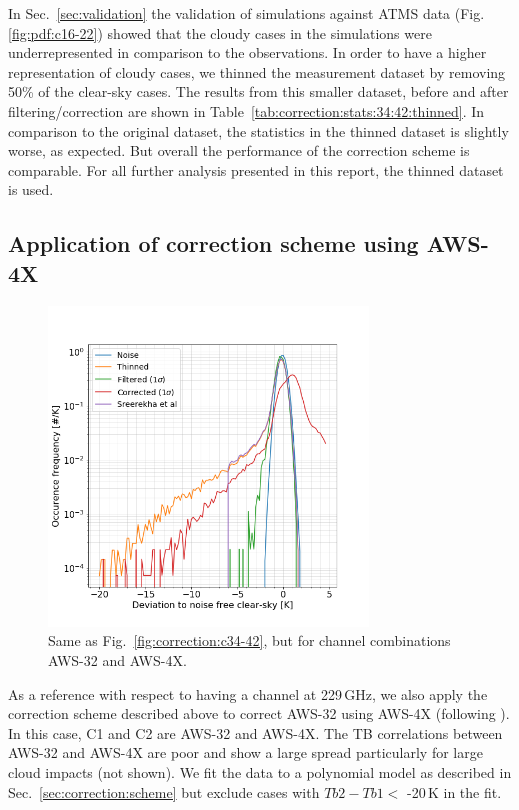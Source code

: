 \documentclass[12pt]{article}
\begin{document}
In Sec.~\ref{sec:validation} the validation of simulations against ATMS data
(Fig.\ref{fig:pdf:c16-22}) showed that the cloudy cases in the simulations were
underrepresented in comparison to the observations. In order to have a higher
representation of cloudy cases, we thinned the measurement dataset by removing
50\% of the clear-sky cases. The results from this smaller dataset, before and
after filtering/correction are shown in
Table~\ref{tab:correction:stats:34:42:thinned}. In comparison to the original
dataset, the statistics in the thinned dataset is slightly worse, as expected.
But overall the performance of the correction scheme is comparable. For all
further analysis presented in this report, the thinned dataset is used.
%
\subsection{Application of correction scheme using AWS-4X}
%
\begin{figure}[!t]
	\centering
	\includegraphics[height=85mm]{PDF_corrected_AWS-32_AWS-4X_thinned}
	\caption{Same as Fig.~\ref{fig:correction:c34-42}, but for channel combinations AWS-32 and AWS-4X.}
	\label{fig:correction:c32-4X:thinned}
\end{figure}
%

As a reference with respect to having a channel at 229\,GHz, we also apply the
correction scheme described above to correct AWS-32 using AWS-4X (following
\citet{rekha2012potential}). In this case, C1 and C2 are AWS-32 and AWS-4X. The
TB correlations between AWS-32 and AWS-4X are poor and show a large spread
particularly for large cloud impacts (not shown). We fit the data to a polynomial model as described in Sec.~\ref{sec:correction:scheme} but exclude cases with $Tb2-Tb1 <$ -20\,K in the fit.
\end{document}
